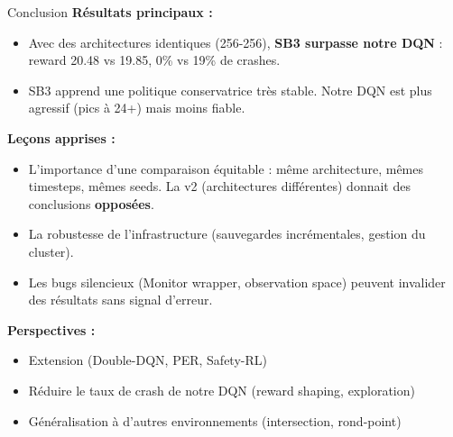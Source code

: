 \documentclass[10pt]{beamer}
\begin{document}
\begin{frame}{Conclusion}
    \textbf{R\'esultats principaux :}
    \begin{itemize}
        \item Avec des architectures identiques (256-256), \textbf{SB3 surpasse notre DQN} : reward 20.48 vs 19.85, 0\% vs 19\% de crashes.
        \item SB3 apprend une politique conservatrice tr\`es stable. Notre DQN est plus agressif (pics \`a 24+) mais moins fiable.
    \end{itemize}

    \vspace{0.3cm}
    \textbf{Le\c{c}ons apprises :}
    \begin{itemize}
        \item L'importance d'une comparaison \'equitable : m\^eme architecture, m\^emes timesteps, m\^emes seeds. La v2 (architectures diff\'erentes) donnait des conclusions \textbf{oppos\'ees}.
        \item La robustesse de l'infrastructure (sauvegardes incr\'ementales, gestion du cluster).
        \item Les bugs silencieux (Monitor wrapper, observation space) peuvent invalider des r\'esultats sans signal d'erreur.
    \end{itemize}

    \vspace{0.3cm}
    \textbf{Perspectives :}
    \begin{itemize}
        \item Extension (Double-DQN, PER, Safety-RL)
        \item R\'eduire le taux de crash de notre DQN (reward shaping, exploration)
        \item G\'en\'eralisation \`a d'autres environnements (intersection, rond-point)
    \end{itemize}
\end{frame}
\end{document}
